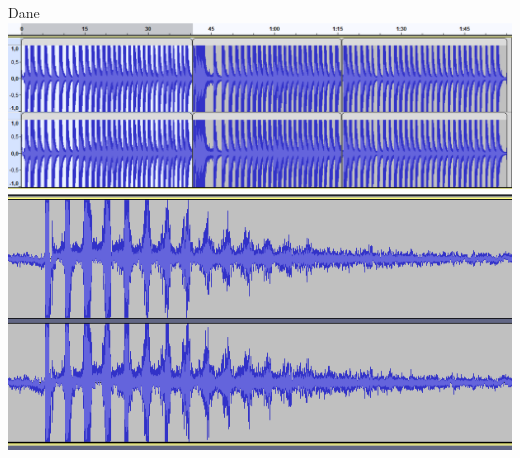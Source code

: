 \documentclass{beamer}
\begin{document}
\begin{frame}{Dane}
	\centering
	\includegraphics[width=\linewidth]{Data.png}
	\includegraphics[width=0.7\linewidth]{Przechwycenie obrazu ekranu_2024-05-04_14-41-05.png}
\end{frame}
\end{document}
